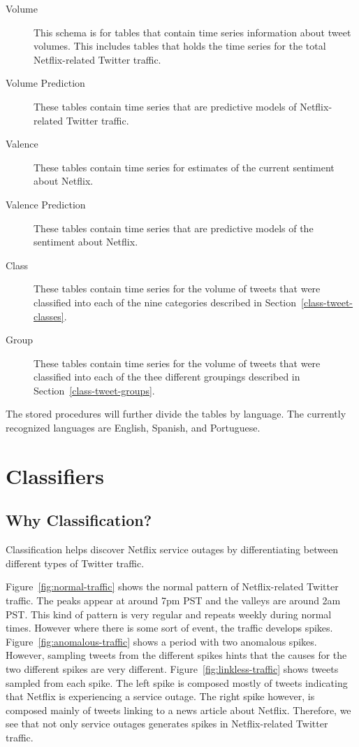 \documentclass[12pt]{ucthesis}
\begin{document}
\begin{description}
   \item[Volume]
   This schema is for tables that contain time series information about tweet volumes.
   This includes tables that holds the time series for the total Netflix-related Twitter traffic.

   \item[Volume Prediction]
   These tables contain time series that are predictive models of Netflix-related Twitter traffic.

   \item[Valence]
   These tables contain time series for estimates of the current sentiment about Netflix.

   \item[Valence Prediction]
   These tables contain time series that are predictive models of the sentiment about Netflix.

   \item[Class]
   These tables contain time series for the volume of tweets that were classified into
   each of the nine categories described in Section~\ref{class-tweet-classes}.

   \item[Group]
   These tables contain time series for the volume of tweets that were classified into
   each of the thee different groupings described in Section~\ref{class-tweet-groups}.
\end{description}

The stored procedures will further divide the tables by language. The currently recognized languages are English,
Spanish, and Portuguese.

\part{Classifiers}
\label{classifiers}

\chapter{Why Classification?}
\label{class-why}
Classification helps discover Netflix service outages by differentiating between different types of Twitter traffic.

Figure~\ref{fig:normal-traffic} shows the normal pattern of Netflix-related Twitter traffic. The peaks appear at around 7pm
PST and the valleys are around 2am PST. This kind of pattern is very regular and repeats weekly during normal times. However
where there is some sort of event, the traffic develops spikes. Figure~\ref{fig:anomalous-traffic} shows a period with two
anomalous spikes. However, sampling tweets from the different spikes hints that the causes for the two different spikes
are very different. Figure~\ref{fig:linkless-traffic} shows tweets sampled from each spike. The left spike is composed mostly
of tweets indicating that Netflix is experiencing a service outage. The right spike however, is composed mainly of tweets linking to
a news article about Netflix. Therefore, we see that not only service outages generates spikes in Netflix-related Twitter traffic.
\end{document}
